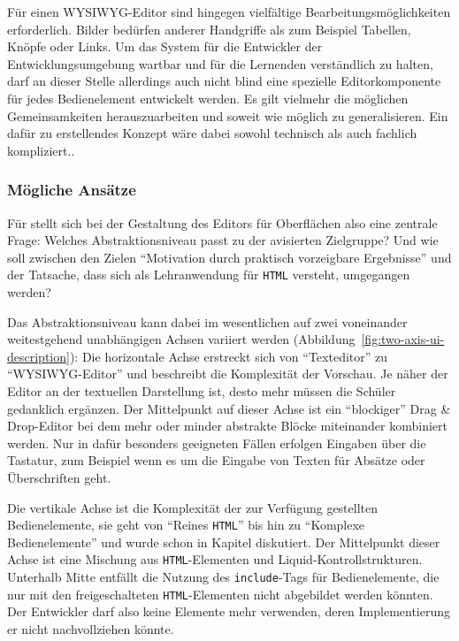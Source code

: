 Für einen WYSIWYG-Editor sind hingegen vielfältige Bearbeitungsmöglichkeiten erforderlich. Bilder bedürfen anderer Handgriffe als zum Beispiel Tabellen, Knöpfe oder Links. Um das System für die Entwickler der Entwicklungsumgebung wartbar und für die Lernenden verständlich zu halten, darf an dieser Stelle allerdings auch nicht blind eine spezielle Editorkomponente für jedes Bedienelement entwickelt werden. Es gilt vielmehr die möglichen Gemeinsamkeiten herauszuarbeiten und soweit wie möglich zu generalisieren. Ein dafür zu erstellendes Konzept wäre dabei sowohl technisch als auch fachlich kompliziert..

\subsubsection{Mögliche Ansätze}

Für \idename{} stellt sich bei der Gestaltung des Editors für Oberflächen also eine zentrale Frage: Welches Abstraktionsniveau passt zu der avisierten Zielgruppe? Und wie soll zwischen den Zielen "`Motivation durch praktisch vorzeigbare Ergebnisse"' und der Tatsache, dass \idename{} sich als Lehranwendung für \texttt{HTML} versteht, umgegangen werden?

Das Abstraktionsniveau kann dabei im wesentlichen auf zwei voneinander weitestgehend unabhängigen Achsen variiert werden (Abbildung~\ref{fig:two-axis-ui-description}): Die horizontale Achse erstreckt sich von "`Texteditor"' zu "`WYSIWYG-Editor"' und beschreibt die Komplexität der Vorschau. Je näher der Editor an der textuellen Darstellung ist, desto mehr müssen die Schüler gedanklich ergänzen. Der Mittelpunkt auf dieser Achse ist ein "`blockiger"' Drag \& Drop-Editor bei dem mehr oder minder abstrakte Blöcke miteinander kombiniert werden. Nur in dafür besonders geeigneten Fällen erfolgen Eingaben über die Tastatur, zum Beispiel wenn es um die Eingabe von Texten für Absätze oder Überschriften geht.

Die vertikale Achse ist die Komplexität der zur Verfügung gestellten Bedienelemente, sie geht von "`Reines \texttt{HTML}"' bis hin zu "`Komplexe Bedienelemente"' und wurde schon in Kapitel  diskutiert. Der Mittelpunkt dieser Achse ist eine Mischung aus \texttt{HTML}-Elementen und Liquid-Kontrollstrukturen. Unterhalb Mitte entfällt die Nutzung des \texttt{include}-Tags für Bedienelemente, die nur mit den freigeschalteten \texttt{HTML}-Elementen nicht abgebildet werden könnten. Der Entwickler darf also keine Elemente mehr verwenden, deren Implementierung er nicht nachvollziehen könnte.


